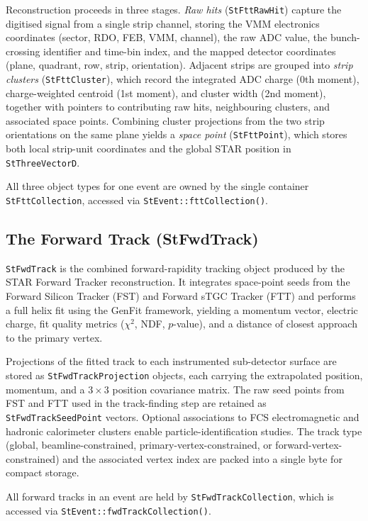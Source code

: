 \documentclass[twoside]{article}
\begin{document}
Reconstruction proceeds in three stages.  \emph{Raw hits} (\texttt{StFttRawHit}) capture
the digitised signal from a single strip channel, storing the VMM electronics coordinates
(sector, RDO, FEB, VMM, channel), the raw ADC value, the bunch-crossing identifier and
time-bin index, and the mapped detector coordinates (plane, quadrant, row, strip,
orientation).  Adjacent strips are grouped into \emph{strip clusters}
(\texttt{StFttCluster}), which record the integrated ADC charge (0th moment),
charge-weighted centroid (1st moment), and cluster width (2nd moment), together with
pointers to contributing raw hits, neighbouring clusters, and associated space points.
Combining cluster projections from the two strip orientations on the same plane yields a
\emph{space point} (\texttt{StFttPoint}), which stores both local strip-unit coordinates
and the global STAR position in \texttt{StThreeVectorD}.

All three object types for one event are owned by the single container
\texttt{StFttCollection}, accessed via \texttt{StEvent::fttCollection()}.

\subsection{The Forward Track (StFwdTrack)}
\texttt{StFwdTrack} is the combined forward-rapidity tracking object produced by the STAR
Forward Tracker reconstruction.  It integrates space-point seeds from the Forward Silicon
Tracker (FST) and Forward sTGC Tracker (FTT) and performs a full helix fit using the
GenFit framework, yielding a momentum vector, electric charge, fit quality metrics
($\chi^2$, NDF, $p$-value), and a distance of closest approach to the primary vertex.

Projections of the fitted track to each instrumented sub-detector surface are stored as
\texttt{StFwdTrackProjection} objects, each carrying the extrapolated position, momentum,
and a $3\times3$ position covariance matrix.  The raw seed points from FST and FTT used
in the track-finding step are retained as \texttt{StFwdTrackSeedPoint} vectors.  Optional
associations to FCS electromagnetic and hadronic calorimeter clusters enable
particle-identification studies.  The track type (global, beamline-constrained,
primary-vertex-constrained, or forward-vertex-constrained) and the associated vertex
index are packed into a single byte for compact storage.

All forward tracks in an event are held by \texttt{StFwdTrackCollection}, which is
accessed via \texttt{StEvent::fwdTrackCollection()}.
\end{document}
